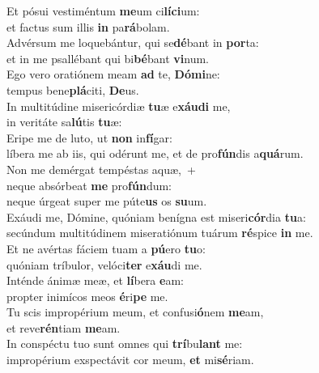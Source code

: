 \evenverse Et pósui vestiméntum \textbf{me}um ci\textbf{lí}\textbf{ci}um:~\*\\
\evenverse et factus sum illis \textbf{in} pa\textbf{rá}bolam.\\
\oddverse Advérsum me loquebántur, qui se\textbf{dé}bant in \textbf{por}ta:~\*\\
\oddverse et in me psallébant qui bi\textbf{bé}bant \textbf{vi}num.\\
\evenverse Ego vero oratiónem meam \textbf{ad} te, \textbf{Dó}\textbf{mi}ne:~\*\\
\evenverse tempus bene\textbf{plá}citi, \textbf{De}us.\\
\oddverse In multitúdine misericórdiæ \textbf{tu}æ e\textbf{xáu}\textbf{di} me,~\*\\
\oddverse in veritáte sa\textbf{lú}tis \textbf{tu}æ:\\
\evenverse Eripe me de luto, ut \textbf{non} in\textbf{fí}gar:~\*\\
\evenverse líbera me ab iis, qui odérunt me, et de pro\textbf{fún}dis a\textbf{quá}rum.\\
\oddverse Non me demérgat tempéstas aquæ,~+\\
\oddverse  neque absórbeat \textbf{me} pro\textbf{fún}dum:~\*\\
\oddverse neque úrgeat super me púte\textbf{us} os \textbf{su}um.\\
\evenverse Exáudi me, Dómine, quóniam benígna est miseri\textbf{cór}dia \textbf{tu}a:~\*\\
\evenverse secúndum multitúdinem miseratiónum tuárum \textbf{ré}spice \textbf{in} me.\\
\oddverse Et ne avértas fáciem tuam a \textbf{pú}ero \textbf{tu}o:~\*\\
\oddverse quóniam tríbulor, velóci\textbf{ter} e\textbf{xáu}di me.\\
\evenverse Inténde ánimæ meæ, et \textbf{lí}bera \textbf{e}am:~\*\\
\evenverse propter inimícos meos \textbf{é}ri\textbf{pe} me.\\
\oddverse Tu scis impropérium meum, et confusi\textbf{ó}nem \textbf{me}am,~\*\\
\oddverse et reve\textbf{rén}tiam \textbf{me}am.\\
\evenverse In conspéctu tuo sunt omnes qui \textbf{trí}bu\textbf{lant} me:~\*\\
\evenverse impropérium exspectávit cor meum, \textbf{et} mi\textbf{sé}riam.\\
